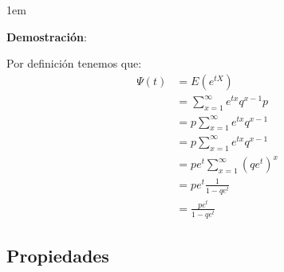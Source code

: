 \documentclass[12pt, fleqn]{report}                             %
\newenvironment{SmallIndentation}[1][0.75em]                    %
        {\begin{adjustwidth}{#1}{}\begin{footnotesize}}             %
        {\end{footnotesize}\end{adjustwidth}}                       %
\theoremstyle{break}                                            %
\newcommand{\Wrap}[1]           {\left( #1 \right)}             %
\begin{document}
                \begin{SmallIndentation}[1em]
                    \textbf{Demostración}:
                    
                    Por definición tenemos que:
                    \begin{align*}
                        \Psi (t) 
                            &= E\Wrap{e^{tX}}                                       \\
                            &= \sum_{x=1}^\infty e^{tx} q^{x-1}p                    \\
                            &= p \sum_{x=1}^\infty e^{tx} q^{x-1}                   \\
                            &= p \sum_{x=1}^\infty e^{tx} q^{x-1}                   \\
                            &= p e^t \sum_{x=1}^\infty (qe^t)^x                     \\
                            &= p e^t \frac{1}{1 - qe^t}                             \\
                            &= \frac{pe^t}{1-qe^t} 
                    \end{align*}
                
                \end{SmallIndentation}
                    

            \clearpage
            \subsection{Propiedades}
\end{document}
